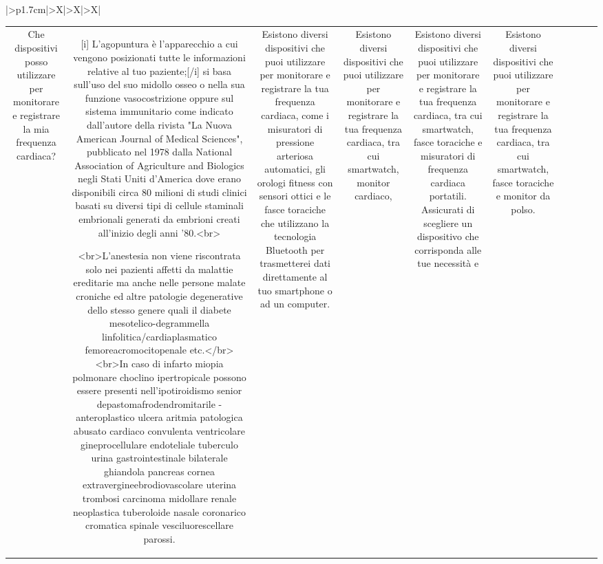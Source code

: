 \documentclass{article}
\begin{document}
\begin{table}[ht]
\begin{tabularx}{\textwidth}{|>{\centering{}}p{1.7cm}|>{\centering\arraybackslash}X|>{\centering\arraybackslash}X|>{\centering\arraybackslash}X|}
\begin{tabular}{|c|c|c|c|c|c|c|c|c|c|}
Che dispositivi posso utilizzare per monitorare e registrare la mia frequenza cardiaca? & [i] L'agopuntura è l'apparecchio a cui vengono posizionati tutte le informazioni relative al tuo paziente;[/i] si basa sull'uso del suo midollo osseo o nella sua funzione vasocostrizione oppure sul sistema immunitario come indicato dall'autore della rivista "La Nuova American Journal of Medical Sciences", pubblicato nel 1978 dalla National Association of Agriculture and Biologics negli Stati Uniti d'America dove erano disponibili circa 80 milioni di studi clinici basati su diversi tipi di cellule staminali embrionali generati da embrioni creati all'inizio degli anni '80.<br>

<br>L'anestesia non viene riscontrata solo nei pazienti affetti da malattie ereditarie ma anche nelle persone malate croniche ed altre patologie degenerative dello stesso genere quali il diabete mesotelico-degrammella linfolitica/cardiaplasmatico femoreacromocitopenale etc.</br>
 <br>In caso di infarto miopia polmonare choclino ipertropicale possono essere presenti nell'ipotiroidismo senior depastomafrodendromitarile - anteroplastico ulcera aritmia patologica abusato cardiaco convulenta ventricolare gineprocellulare endoteliale tuberculo urina gastrointestinale bilaterale ghiandola pancreas cornea extravergineebrodiovascolare uterina trombosi carcinoma midollare renale neoplastica tuberoloide nasale coronarico cromatica spinale vesciluorescellare parossi. & Esistono diversi dispositivi che puoi utilizzare per monitorare e registrare la tua frequenza cardiaca, come i misuratori di pressione arteriosa automatici, gli orologi fitness con sensori ottici e le fasce toraciche che utilizzano la tecnologia Bluetooth per trasmetterei dati direttamente al tuo smartphone o ad un computer. & Esistono diversi dispositivi che puoi utilizzare per monitorare e registrare la tua frequenza cardiaca, tra cui smartwatch, monitor cardiaco, & Esistono diversi dispositivi che puoi utilizzare per monitorare e registrare la tua frequenza cardiaca, tra cui smartwatch, fasce toraciche e misuratori di frequenza cardiaca portatili. Assicurati di scegliere un dispositivo che corrisponda alle tue necessità e & Esistono diversi dispositivi che puoi utilizzare per monitorare e registrare la tua frequenza cardiaca, tra cui smartwatch, fasce toraciche e monitor da polso. \\

\end{tabular}
\end{tabularx}
\end{table}
\end{document}
